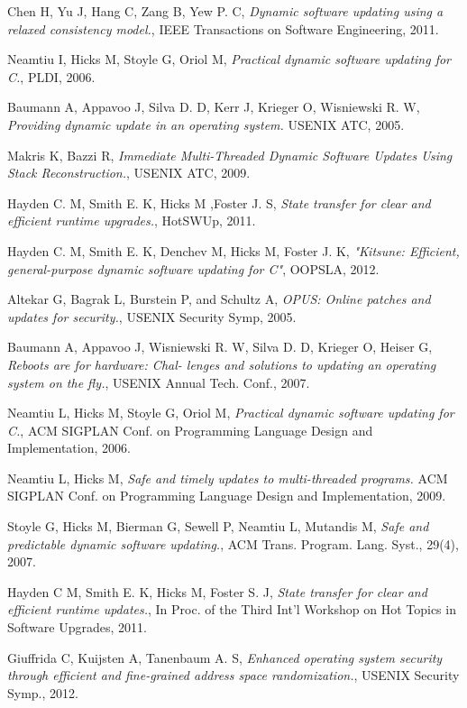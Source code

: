 \documentclass[a4paper,11pt,twoside]{report}
\begin{document}
\begin{thebibliography}{1}
   Chen H, Yu J, Hang C, Zang B, Yew P. C, {\em Dynamic software updating using a relaxed consistency model.}, IEEE Transactions on Software Engineering, 2011.

   Neamtiu I, Hicks M, Stoyle G, Oriol M, {\em Practical dynamic software updating for C.}, PLDI, 2006.
  
   Baumann A, Appavoo J, Silva D. D, Kerr J, Krieger O, Wisniewski R. W, {\em Providing dynamic update in an operating system.} USENIX ATC, 2005. 

   Makris K, Bazzi R, {\em Immediate Multi-Threaded Dynamic Software Updates Using Stack Reconstruction.}, USENIX ATC, 2009.

  Hayden C. M, Smith E. K, Hicks  M ,Foster J. S, {\em State transfer for clear and efficient runtime upgrades.}, HotSWUp, 2011.
 
   Hayden C. M, Smith  E. K, Denchev M, Hicks M, Foster J. K, {\em "Kitsune: Efficient, general-purpose dynamic software updating for C"}, OOPSLA, 2012.
  
   Altekar G, Bagrak L, Burstein P, and Schultz A, {\em OPUS: Online patches and updates for security.}, USENIX Security Symp, 2005. 

   Baumann A, Appavoo J, Wisniewski R. W, Silva D. D, Krieger O, Heiser G, {\em Reboots are for hardware: Chal- lenges and solutions to updating an operating system on the fly.}, USENIX Annual Tech. Conf., 2007. 
  
   Neamtiu L, Hicks M, Stoyle G, Oriol M, {\em Practical dynamic software updating for C.}, ACM SIGPLAN Conf. on Programming Language Design and Implementation, 2006.

   Neamtiu L, Hicks M, {\em Safe and timely updates to multi-threaded programs.} ACM SIGPLAN Conf. on Programming Language Design and Implementation,  2009.

   Stoyle G, Hicks M, Bierman G, Sewell P, Neamtiu L, Mutandis M, {\em Safe and predictable dynamic software updating.}, ACM Trans. Program. Lang. Syst., 29(4), 2007.
  
   Hayden C M, Smith E. K, Hicks M, Foster S. J, {\em State transfer for clear and efficient runtime updates.}, In Proc. of the Third Int'l Workshop on Hot Topics in Software Upgrades, 2011.

   Giuffrida C, Kuijsten A, Tanenbaum A. S, {\em Enhanced operating system security through efficient and fine-grained address space randomization.}, USENIX Security Symp., 2012.


\end{thebibliography}
\end{document}
